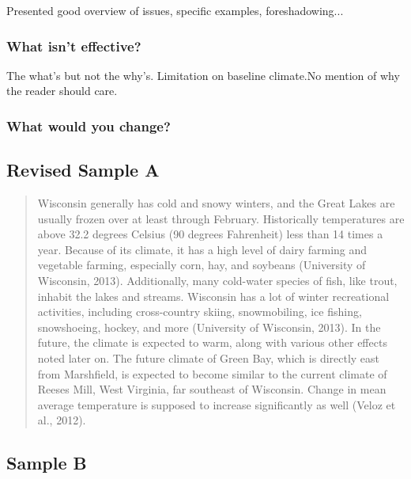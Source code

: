 \documentclass{article}\usepackage[]{graphicx}\usepackage[]{color}
\begin{document}
Presented good overview of issues, specific examples, foreshadowing...

\subsubsection{What isn't effective?}

The what's but not the why's. Limitation on baseline climate.No mention of why the reader should care.


\subsubsection{What would you change?}

\subsection{Revised Sample A}

\begin{quote}
Wisconsin generally has cold and snowy winters, and the Great Lakes are usually frozen over at least through February. Historically temperatures are above 32.2 degrees Celsius (90 degrees Fahrenheit) less than 14 times a year. Because of its climate, it has a high level of dairy farming and vegetable farming, especially corn, hay, and soybeans (University of Wisconsin, 2013). Additionally, many cold-water species of fish, like trout, inhabit the lakes and streams. Wisconsin has a lot of winter recreational activities, including cross-country skiing, snowmobiling, ice fishing, snowshoeing, hockey, and more (University of Wisconsin, 2013). In the future, the climate is expected to warm, along with various other effects noted later on. The future climate of Green Bay, which is directly east from Marshfield, is expected to become similar to the current climate of Reeses Mill, West Virginia, far southeast of Wisconsin. Change in mean average temperature is supposed to increase significantly as well (Veloz et al., 2012). 
\end{quote}


\subsection{Sample B}
\end{document}
